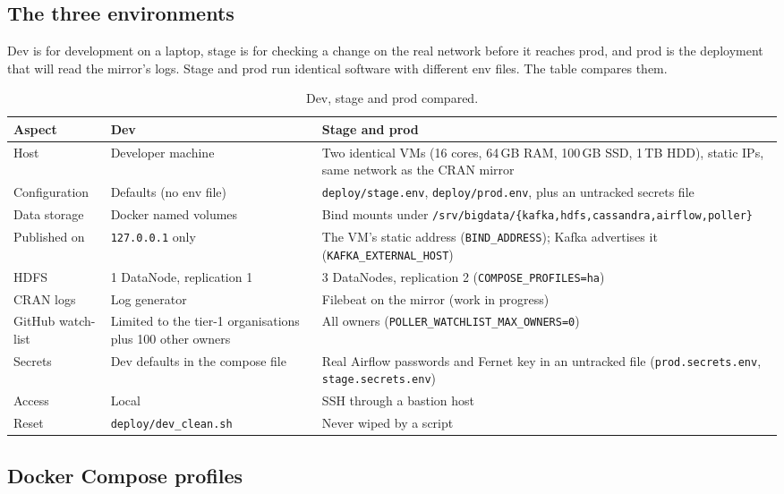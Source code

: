 \documentclass[11pt,a4paper]{article}
\begin{document}
\subsection{The three environments}

Dev is for development on a laptop, stage is for checking a change on the real network before it reaches prod, and prod is the
deployment that will read the mirror's logs. Stage and prod run identical software with different env files. The table compares them.

\begin{table}[htbp]
\centering
\caption{Dev, stage and prod compared.}
\small
\begin{tabularx}{\textwidth}{@{}L{2.9cm}L{4.4cm}Y@{}}
\toprule
\textbf{Aspect} & \textbf{Dev} & \textbf{Stage and prod} \\
\midrule
Host & Developer machine & Two identical VMs (16 cores, 64\,GB RAM, 100\,GB SSD, 1\,TB HDD), static IPs, same network as the CRAN mirror \\
Configuration & Defaults (no env file) & \texttt{deploy/stage.env}, \texttt{deploy/prod.env}, plus an untracked secrets file \\
Data storage & Docker named volumes & Bind mounts under \texttt{/srv/bigdata/\{kafka,\allowbreak hdfs,\allowbreak cassandra,\allowbreak airflow,\allowbreak poller\}} \\
Published on & \texttt{127.0.0.1} only & The VM's static address (\texttt{BIND\_ADDRESS}); Kafka advertises it (\texttt{KAFKA\_EXTERNAL\_HOST}) \\
HDFS & 1 DataNode, replication 1 & 3 DataNodes, replication 2 (\texttt{COMPOSE\_PROFILES=ha}) \\
CRAN logs & Log generator & Filebeat on the mirror (work in progress) \\
GitHub watch-list & Limited to the tier-1 organisations plus 100 other owners & All owners (\texttt{POLLER\_WATCHLIST\_MAX\_OWNERS=0}) \\
Secrets & Dev defaults in the compose file & Real Airflow passwords and Fernet key in an untracked file (\texttt{prod.secrets.env}, \texttt{stage.secrets.env}) \\
Access & Local & SSH through a bastion host \\
Reset & \texttt{deploy/dev\_clean.sh} & Never wiped by a script \\
\bottomrule
\end{tabularx}
\end{table}

\subsection{Docker Compose profiles}
\end{document}
